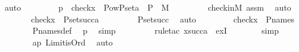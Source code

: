 \begin{isabellebody}
\ auto\ \isanewline
\ \ \ \ \isamarkupfalse%
\ \isamarkupfalse%
\ p{}\ {\isacharcolon}{\kern0pt}\ {\isachardoublequoteopen}check{\isacharparenleft}{\kern0pt}x{\isacharparenright}{\kern0pt}\ {\isasymin}\ Pow{\isacharparenleft}{\kern0pt}P{\isacharunderscore}{\kern0pt}set{\isacharparenleft}{\kern0pt}a{\isacharparenright}{\kern0pt}\ {\isasymtimes}\ P{\isacharparenright}{\kern0pt}\ {\isasyminter}\ M{\isachardoublequoteclose}\ \isanewline
\ \ \ \ \ \ \isamarkupfalse%
\ check{\isacharunderscore}{\kern0pt}in{\isacharunderscore}{\kern0pt}M\ assm\ \isamarkupfalse%
\ auto\ \isanewline
\ \ \ \ \isamarkupfalse%
\ \isamarkupfalse%
\ {\isachardoublequoteopen}check{\isacharparenleft}{\kern0pt}x{\isacharparenright}{\kern0pt}\ {\isasymin}\ P{\isacharunderscore}{\kern0pt}set{\isacharparenleft}{\kern0pt}succ{\isacharparenleft}{\kern0pt}a{\isacharparenright}{\kern0pt}{\isacharparenright}{\kern0pt}{\isachardoublequoteclose}\ \isanewline
\ \ \ \ \ \ \isamarkupfalse%
\ P{\isacharunderscore}{\kern0pt}set{\isacharunderscore}{\kern0pt}succ\ \isamarkupfalse%
\ auto\ \isanewline
\ \ \ \ \isamarkupfalse%
\ \isamarkupfalse%
\ {\isachardoublequoteopen}check{\isacharparenleft}{\kern0pt}x{\isacharparenright}{\kern0pt}\ {\isasymin}\ P{\isacharunderscore}{\kern0pt}names{\isachardoublequoteclose}\isanewline
\ \ \ \ \ \ \isamarkupfalse%
\ P{\isacharunderscore}{\kern0pt}names{\isacharunderscore}{\kern0pt}def\ \isamarkupfalse%
\ p{}\ \isamarkupfalse%
\ simp\ \isanewline
\ \ \ \ \ \ \isamarkupfalse%
\ {\isacharparenleft}{\kern0pt}rule{\isacharunderscore}{\kern0pt}tac\ x{\isacharequal}{\kern0pt}{\isachardoublequoteopen}succ{\isacharparenleft}{\kern0pt}a{\isacharparenright}{\kern0pt}{\isachardoublequoteclose}\ \ exI{\isacharparenright}{\kern0pt}\isanewline
\ \ \ \ \ \ \isamarkupfalse%
\ simp\ \isanewline
\ \ \ \ \ \ \isamarkupfalse%
\ ap\ Limit{\isacharunderscore}{\kern0pt}is{\isacharunderscore}{\kern0pt}Ord\ \isamarkupfalse%
\ auto\ \isanewline
\ \ \isamarkupfalse%
\isanewline
{}\isamarkupfalse%
%
\endisatagproof
{\isafoldproof}%
%
\isadelimproof
\isanewline
%
\endisadelimproof
\isanewline
{}\isamarkupfalse%
\isanewline
%
\isadelimtheory
%
\endisadelimtheory
%
\isatagtheory
{}\isamarkupfalse%
%
\endisatagtheory
{\isafoldtheory}%
%
\isadelimtheory
%
\endisadelimtheory
%
\end{isabellebody}%
